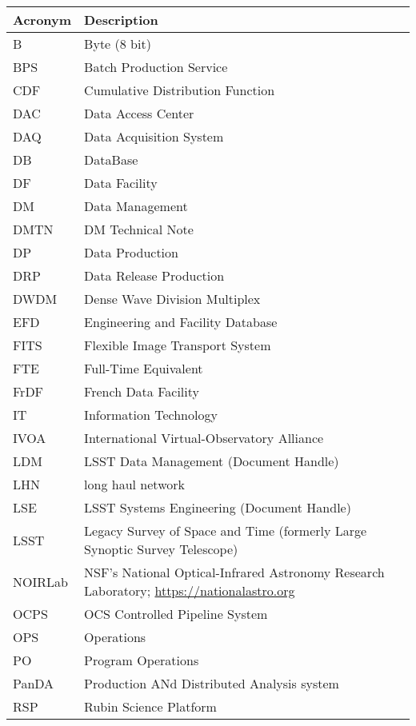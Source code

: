 \addtocounter{table}{-1}
\begin{longtable}{p{}p{}}\hline
\textbf{Acronym} & \textbf{Description}  \\\hline

B & Byte (8 bit) \\\hline
BPS & Batch Production Service \\\hline
CDF & Cumulative Distribution Function \\\hline
DAC & Data Access Center \\\hline
DAQ & Data Acquisition System \\\hline
DB & DataBase \\\hline
DF & Data Facility \\\hline
DM & Data Management \\\hline
DMTN & DM Technical Note \\\hline
DP & Data Production \\\hline
DRP & Data Release Production \\\hline
DWDM & Dense Wave Division Multiplex \\\hline
EFD & Engineering and Facility Database \\\hline
FITS & Flexible Image Transport System \\\hline
FTE & Full-Time Equivalent \\\hline
FrDF & French Data Facility \\\hline
IT & Information Technology \\\hline
IVOA & International Virtual-Observatory Alliance \\\hline
LDM & LSST Data Management (Document Handle) \\\hline
LHN & long haul network \\\hline
LSE & LSST Systems Engineering (Document Handle) \\\hline
LSST & Legacy Survey of Space and Time (formerly Large Synoptic Survey Telescope) \\\hline
NOIRLab & NSF's National Optical-Infrared Astronomy Research Laboratory; \url{https://nationalastro.org} \\\hline
OCPS & OCS Controlled Pipeline System \\\hline
OPS & Operations \\\hline
PO & Program Operations \\\hline
PanDA &  Production ANd Distributed Analysis system \\\hline
RSP & Rubin Science Platform \\\hline

\end{longtable}
